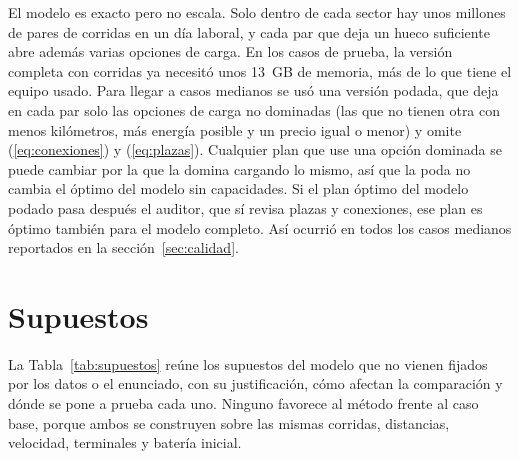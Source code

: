 El modelo es exacto pero no escala. Solo dentro de cada sector hay unos \ParesSectorMillones{} millones de pares de corridas en un día laboral, y cada par que deja un hueco suficiente abre además varias opciones de carga. En los casos de prueba, la versión completa con \CorridasRutasMediano{} corridas ya necesitó unos 13~GB de memoria, más de lo que tiene el equipo usado. Para llegar a casos medianos se usó una versión podada, que deja en cada par solo las opciones de carga no dominadas (las que no tienen otra con menos kilómetros, más energía posible y un precio igual o menor) y omite (\ref{eq:conexiones}) y (\ref{eq:plazas}). Cualquier plan que use una opción dominada se puede cambiar por la que la domina cargando lo mismo, así que la poda no cambia el óptimo del modelo sin capacidades. Si el plan óptimo del modelo podado pasa después el auditor, que sí revisa plazas y conexiones, ese plan es óptimo también para el modelo completo. Así ocurrió en todos los casos medianos reportados en la sección~\ref{sec:calidad}.

\section{Supuestos}
\label{sec:supuestos}

La Tabla~\ref{tab:supuestos} reúne los supuestos del modelo que no vienen fijados por los datos o el enunciado, con su justificación, cómo afectan la comparación y dónde se pone a prueba cada uno. Ninguno favorece al método frente al caso base, porque ambos se construyen sobre las mismas corridas, distancias, velocidad, terminales y batería inicial.

